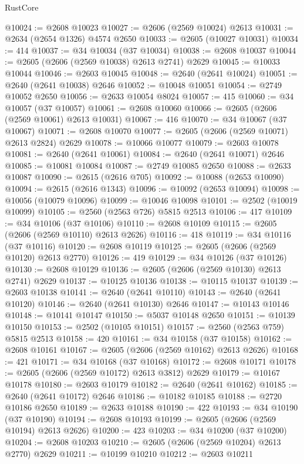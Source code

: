 \begin{lexlean}{RustCore}
\begin{coremodule}
@10024 := @2608 @10023
@10027 := @2606 (@2569 @10024) @2613
@10031 := @2634 (@2654 @1326) @4574 @2650
@10033 := @2605 (@10027 @10031)
@10034 := 414
@10037 := @34 @10034 (@37 @10034)
@10038 := @2608 @10037
@10044 := @2605 (@2606 (@2569 @10038) @2613 @2741) @2629
@10045 := @10033 @10044
@10046 := @2603 @10045
@10048 := @2640 (@2641 @10024)
@10051 := @2640 (@2641 @10038) @2646
@10052 := @10048 @10051
@10054 := @2749 @10052 @2650
@10056 := @2633 @10054 @8024
@10057 := 415
@10060 := @34 @10057 (@37 @10057)
@10061 := @2608 @10060
@10066 := @2605 (@2606 (@2569 @10061) @2613 @10031)
@10067 := 416
@10070 := @34 @10067 (@37 @10067)
@10071 := @2608 @10070
@10077 := @2605 (@2606 (@2569 @10071) @2613 @2824) @2629
@10078 := @10066 @10077
@10079 := @2603 @10078
@10081 := @2640 (@2641 @10061)
@10084 := @2640 (@2641 @10071) @2646
@10085 := @10081 @10084
@10087 := @2749 @10085 @2650
@10088 := @2633 @10087
@10090 := @2615 (@2616 @705)
@10092 := @10088 (@2653 @10090)
@10094 := @2615 (@2616 @1343)
@10096 := @10092 (@2653 @10094)
@10098 := @10056 (@10079 @10096)
@10099 := @10046 @10098
@10101 := @2502 (@10019 @10099)
@10105 := @2560 (@2563 @726) @5815 @2513
@10106 := 417
@10109 := @34 @10106 (@37 @10106)
@10110 := @2608 @10109
@10115 := @2605 (@2606 (@2569 @10110) @2613 @2626)
@10116 := 418
@10119 := @34 @10116 (@37 @10116)
@10120 := @2608 @10119
@10125 := @2605 (@2606 (@2569 @10120) @2613 @2770)
@10126 := 419
@10129 := @34 @10126 (@37 @10126)
@10130 := @2608 @10129
@10136 := @2605 (@2606 (@2569 @10130) @2613 @2741) @2629
@10137 := @10125 @10136
@10138 := @10115 @10137
@10139 := @2603 @10138
@10141 := @2640 (@2641 @10110)
@10143 := @2640 (@2641 @10120)
@10146 := @2640 (@2641 @10130) @2646
@10147 := @10143 @10146
@10148 := @10141 @10147
@10150 := @5037 @10148 @2650
@10151 := @10139 @10150
@10153 := @2502 (@10105 @10151)
@10157 := @2560 (@2563 @759) @5815 @2513
@10158 := 420
@10161 := @34 @10158 (@37 @10158)
@10162 := @2608 @10161
@10167 := @2605 (@2606 (@2569 @10162) @2613 @2626)
@10168 := 421
@10171 := @34 @10168 (@37 @10168)
@10172 := @2608 @10171
@10178 := @2605 (@2606 (@2569 @10172) @2613 @3812) @2629
@10179 := @10167 @10178
@10180 := @2603 @10179
@10182 := @2640 (@2641 @10162)
@10185 := @2640 (@2641 @10172) @2646
@10186 := @10182 @10185
@10188 := @2720 @10186 @2650
@10189 := @2633 @10188
@10190 := 422
@10193 := @34 @10190 (@37 @10190)
@10194 := @2608 @10193
@10199 := @2605 (@2606 (@2569 @10194) @2613 @2626)
@10200 := 423
@10203 := @34 @10200 (@37 @10200)
@10204 := @2608 @10203
@10210 := @2605 (@2606 (@2569 @10204) @2613 @2770) @2629
@10211 := @10199 @10210
@10212 := @2603 @10211

\end{coremodule}
\end{lexlean}
